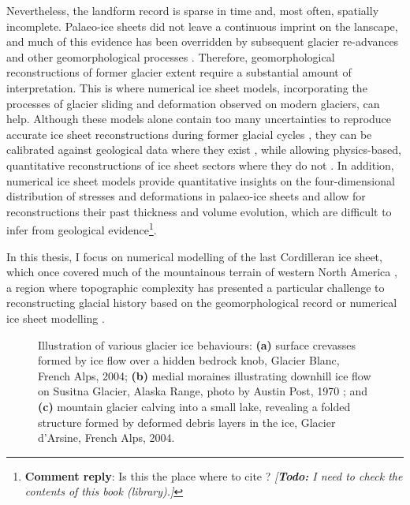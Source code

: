\documentclass{article}
\newcommand{\renote}[1]{\footnote{\textbf{Comment reply}: #1}}
\newcommand{\todo}[1]{\emph{[\textbf{Todo:} #1]}}
\newcommand{\subgraphics}[3][,]{%
  \setbox1=\hbox{\texttt{[image: \#3]}}%
  \leavevmode\rlap{\usebox1}%
  \rlap{\hspace*{0.25em}
        \raisebox{\dimexpr\ht1-3ex}{\textbf{(#2)}}}%
  \phantom{\usebox1}%
}
\begin{document}
Nevertheless, the landform record is sparse in time and, most often, spatially
incomplete. Palaeo-ice sheets did not leave a continuous imprint on the
lanscape, and much of this evidence has been overridden by subsequent glacier
re-advances and other geomorphological processes \citep{Kleman.1994,
Kleman.etal.2006, Kleman.etal.2010}.
Therefore, geomorphological reconstructions of former glacier extent require a
substantial amount of interpretation. This is where numerical ice sheet models,
incorporating the processes of glacier sliding \citep[e.g.,][]{Weertman.1957}
and deformation \citep[e.g.,][]{Nye.1953} observed on modern glaciers, can
help. Although these models alone contain too many uncertainties to reproduce
accurate ice sheet reconstructions during former glacial cycles
\citep[e.g.,][]{Hebeler.etal.2008}, they can be calibrated against geological
data where they exist \citep{Napieralski.etal.2007}, while allowing
physics-based, quantitative reconstructions of ice sheet sectors where they do
not
\citep[e.g.,][]{Marshall.etal.2002, Tarasov.Peltier.2004}.
In addition, numerical ice sheet models provide quantitative insights on the
four-dimensional distribution of stresses and deformations in palaeo-ice sheets
and allow for reconstructions their past thickness and volume evolution, which
are difficult to infer from geological evidence\renote{
    Is this the place where to cite \citep{Denton.Hughes.1981}? \todo{I need to
    check the contents of this book (library).}
}.

In this thesis, I focus on numerical modelling of the last Cordilleran ice
sheet, which once covered much of the mountainous terrain of western North
America \citep{Dawson.1888}, a region where topographic complexity has
presented a particular challenge to reconstructing glacial history based on the
geomorphological record \citep[e.g.,][]{Kleman.etal.2010} or numerical ice
sheet modelling \citep{Robert.1991}.

\begin{figure}
  \centering
  \makebox[0pt]{
    \subgraphics{a}{photo-glacier-crevasses}
    \hspace{1cm}
    \subgraphics{b}{photo-glacier-susitna}
    \hspace{1cm}
    \subgraphics{c}{photo-glacier-fold}
  }
  \caption{Illustration of various glacier ice behaviours:
           \textbf{(a)} surface crevasses formed by ice flow over a hidden
           bedrock knob, Glacier Blanc, French Alps, 2004;
           \textbf{(b)} medial moraines illustrating downhill ice flow on
           Susitna Glacier, Alaska Range, photo by Austin Post, 1970
           \citep{NSIDC.2009}; and
           \textbf{(c)} mountain glacier calving into a small lake, revealing a
           folded structure formed by deformed debris layers in the ice,
           Glacier d'Arsine, French Alps, 2004.}
  \label{fig:glacier-mechanics}
\end{figure}
\end{document}
